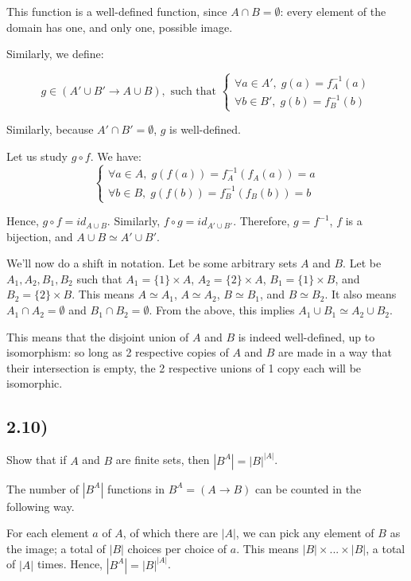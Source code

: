 \documentclass[12pt, letterpaper, twoside]{report}
\begin{document}
This function is a well-defined function, since $A \cap B = \emptyset$: every element of the domain has one, and only one, possible image.

Similarly, we define:

$$
g \in (A' \cup B' \to A \cup B),
\text{ such that }
\begin{cases}
	\forall a \in A', \; g(a) = f_A^{-1}(a) \\
	\forall b \in B', \; g(b) = f_B^{-1}(b)
\end{cases}
$$

Similarly, because $A' \cap B' = \emptyset$, $g$ is well-defined.

Let us study $g \circ f$. We have:
$$
\begin{cases}
	\forall a \in A, \; g(f(a)) = f_A^{-1}(f_A(a)) = a \\
	\forall b \in B, \; g(f(b)) = f_B^{-1}(f_B(b)) = b
\end{cases}
$$

Hence, $g \circ f = id_{A \cup B}$.
Similarly, $f \circ g = id_{A' \cup B'}$.
Therefore, $g = f^{-1}$, $f$ is a bijection, and $A \cup B \simeq A' \cup B'$.

We'll now do a shift in notation. Let be some arbitrary sets $A$ and $B$. Let be $A_1, A_2, B_1, B_2$ such that $A_1 = \{ 1 \} \times A$, $A_2 = \{ 2 \} \times A$, $B_1 = \{ 1 \} \times B$, and $B_2 = \{ 2 \} \times B$. This means $A \simeq A_1$, $A \simeq A_2$, $B \simeq B_1$, and $B \simeq B_2$. It also means $A_1 \cap A_2 = \emptyset$ and $B_1 \cap B_2 = \emptyset$. From the above, this implies $A_1 \cup B_1 \simeq A_2 \cup B_2$.

This means that the disjoint union of $A$ and $B$ is indeed well-defined, up to isomorphism: so long as 2 respective copies of $A$ and $B$ are made in a way that their intersection is empty, the 2 respective unions of 1 copy each will be isomorphic.



\subsection*{2.10)}

Show that if $A$ and $B$ are finite sets, then $|B^A| = |B|^{|A|}$.

The number of $|B^A|$ functions in $B^A = (A \to B)$ can be counted in the following way.

For each element $a$ of $A$, of which there are $|A|$, we can pick any element of $B$ as the image; a total of $|B|$ choices per choice of $a$. This means $|B| \times ... \times |B|$, a total of $|A|$ times. Hence, $|B^A| = |B|^{|A|}$.
\end{document}
